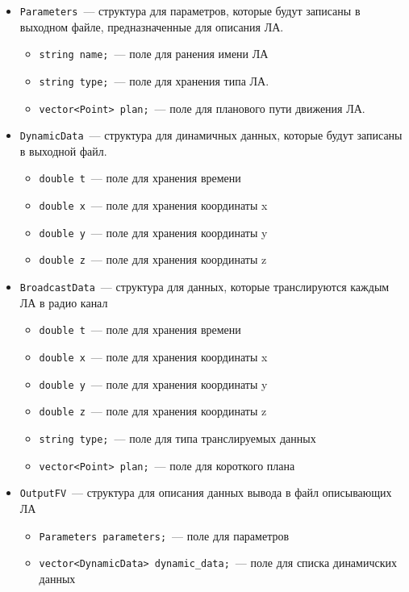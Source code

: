 \documentclass[a4paper,12pt]{article}
\begin{document}
\begin{itemize}
    \item \texttt{Parameters}~--- структура для параметров, которые будут записаны в выходном файле, предназначенные для описания ЛА.
    \begin{itemize}
        \item \texttt{string name;}~--- поле для ранения имени ЛА
        \item \texttt{string type;}~--- поле для хранения типа ЛА.
        \item \texttt{vector<Point> plan;}~--- поле для планового пути движения ЛА.
    \end{itemize}
    \item \texttt{DynamicData}~--- структура для динамичных данных, которые будут записаны в выходной файл. 
    \begin{itemize}
        \item \texttt{double t}~--- поле для хранения времени 
        \item \texttt{double x}~--- поле для хранения координаты x
        \item \texttt{double y}~--- поле для хранения координаты y
        \item \texttt{double z}~--- поле для хранения координаты z 
    \end{itemize}
    \item \texttt{BroadcastData}~--- структура для данных, которые транслируются каждым ЛА в радио канал
    \begin{itemize}
        \item \texttt{double t}~--- поле для хранения времени 
        \item \texttt{double x}~--- поле для хранения координаты x
        \item \texttt{double y}~--- поле для хранения координаты y
        \item \texttt{double z}~--- поле для хранения координаты z
        \item \texttt{string type;}~--- поле для типа транслируемых данных
       \item \texttt{vector<Point> plan;}~--- поле для короткого плана
    \end{itemize}
    \item \texttt{OutputFV}~--- структура для описания данных вывода в файл описывающих ЛА
    \begin{itemize}
        \item \texttt{Parameters parameters;}~--- поле для параметров
        \item \texttt{vector<DynamicData> dynamic\_data;}~--- поле для списка динамичских данных

\end{itemize}
\end{itemize}
\end{document}
